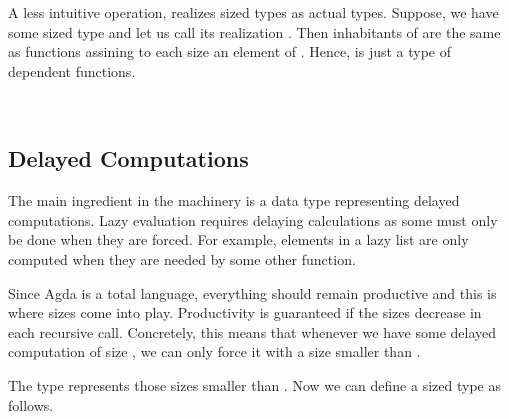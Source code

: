 A less intuitive operation, realizes sized types as actual types.
Suppose, we have some sized type  and let us call its realization \AF{\&} .
Then inhabitants of  are the same as functions assining to each size  an element of .
Hence, \AF{\&}  is just a type of dependent functions.

\begin{code}%
\>[0]\AgdaFunction{\&}\AgdaSpace{}%
\AgdaSymbol{:}\AgdaSpace{}%
\AgdaSpace{}%
\AgdaSpace{}%
\<%
\\
\>[0]\AgdaFunction{\&}\AgdaSpace{}%
\AgdaSpace{}%
\AgdaSymbol{=}\AgdaSpace{}%
\AgdaSymbol{\{}\AgdaSpace{}%
\AgdaSymbol{:}\AgdaSpace{}%
\AgdaSymbol{\}}\AgdaSpace{}%
\AgdaSpace{}%
\AgdaSpace{}%
\<%
\end{code}

\subsection{Delayed Computations}
The main ingredient in the machinery is a data type representing delayed computations.
Lazy evaluation requires delaying calculations as some must only be done when they are forced.
For example, elements in a lazy list are only computed when they are needed by some other function.

Since Agda is a total language, everything should remain productive and this is where sizes come into play.
Productivity is guaranteed if the sizes decrease in each recursive call.
Concretely, this means that whenever we have some delayed computation of size , we can only force it with a size smaller than .

The type   represents those sizes smaller than .
Now we can define a sized type   as follows.

\begin{code}%
\>[0]\AgdaSpace{}%
\AgdaSpace{}%
\AgdaSymbol{(}\AgdaSpace{}%
\AgdaSymbol{:}\AgdaSpace{}%
\AgdaSymbol{)}\AgdaSpace{}%
\AgdaSymbol{(}\AgdaSpace{}%
\AgdaSymbol{:}\AgdaSpace{}%
\AgdaSymbol{)}\AgdaSpace{}%
\AgdaSymbol{:}\AgdaSpace{}%
\AgdaSpace{}%
\<%
\\
\>[0][@{}l@{\AgdaIndent{0}}]%
\>[2]\<%
\\
%
\>[2]\AgdaSpace{}%
\AgdaSpace{}%
\AgdaSymbol{:}\AgdaSpace{}%
\AgdaSymbol{\{}\AgdaSpace{}%
\AgdaSymbol{:}\AgdaSpace{}%
\AgdaSpace{}%
\AgdaSymbol{\}}\AgdaSpace{}%
\AgdaSpace{}%
\AgdaSpace{}%
\<%
\\
\>[0]\AgdaSpace{}%
\AgdaSpace{}%
\<%
\end{code}

